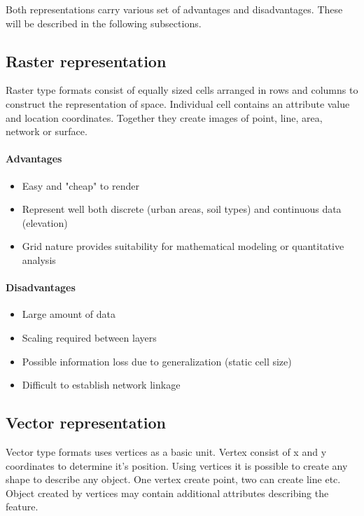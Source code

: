\documentclass[thesis=M,english]{FITthesis}[2012/10/20]
\begin{document}
Both representations carry various set of advantages and disadvantages. These will be described in the following subsections.

\subsection{Raster representation}
Raster type formats consist of equally sized cells arranged in rows and columns to construct the representation of space. Individual cell contains an attribute value and location coordinates. Together they create images of point, line, area, network or surface.

\paragraph*{Advantages}
\begin{itemize}[noitemsep]
\item Easy and "cheap" to render
\item Represent well both discrete (urban areas, soil types) and continuous data (elevation)
\item Grid nature provides suitability for mathematical modeling or quantitative analysis
\end{itemize}

\paragraph*{Disadvantages}
\begin{itemize}[noitemsep]
\item Large amount of data
\item Scaling required between layers
\item Possible information loss due to generalization (static cell size)
\item Difficult to establish network linkage
\end{itemize}

\subsection{Vector representation}
Vector type formats uses vertices as a basic unit. Vertex consist of x and y coordinates to determine it's position. Using vertices it is possible to create any shape to describe any object. One vertex create point, two can create line etc. Object created by vertices may contain additional attributes describing the feature.
\end{document}
